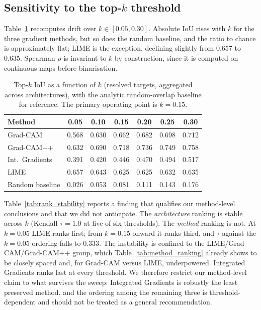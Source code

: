 \documentclass[fleqn,10pt]{wlscirep}
\begin{document}
\subsection*{Sensitivity to the top-$k$ threshold}

Table~\ref{tab:k_sweep} recomputes drift over $k \in [0.05, 0.30]$. Absolute IoU rises with $k$ for the three gradient methods, but so does the random baseline, and the ratio to chance is approximately flat; LIME is the exception, declining slightly from $0.657$ to $0.635$. Spearman $\rho$ is invariant to $k$ by construction, since it is computed on continuous maps before binarisation.

\begin{table}[!ht]
\centering
\caption{Top-$k$ IoU as a function of $k$ (resolved targets, aggregated across architectures), with the analytic random-overlap baseline for reference. The primary operating point is $k = 0.15$.}
\label{tab:k_sweep}
\begin{tabular}{lcccccc}
\toprule
\textbf{Method} & 0.05 & 0.10 & 0.15 & 0.20 & 0.25 & 0.30 \\
\midrule
Grad-CAM & 0.568 & 0.630 & 0.662 & 0.682 & 0.698 & 0.712 \\
Grad-CAM++ & 0.632 & 0.690 & 0.718 & 0.736 & 0.749 & 0.758 \\
Int.\ Gradients & 0.391 & 0.420 & 0.446 & 0.470 & 0.494 & 0.517 \\
LIME & 0.657 & 0.643 & 0.625 & 0.625 & 0.632 & 0.635 \\
\midrule
Random baseline & 0.026 & 0.053 & 0.081 & 0.111 & 0.143 & 0.176 \\
\bottomrule
\end{tabular}
\end{table}

Table~\ref{tab:rank_stability} reports a finding that qualifies our method-level conclusions and that we did not anticipate. The \emph{architecture} ranking is stable across $k$ (Kendall $\tau = 1.0$ at five of six thresholds). The \emph{method} ranking is not. At $k = 0.05$ LIME ranks first; from $k = 0.15$ onward it ranks third, and $\tau$ against the $k = 0.05$ ordering falls to $0.333$. The instability is confined to the LIME/Grad-CAM/Grad-CAM++ group, which Table~\ref{tab:method_ranking} already shows to be closely spaced and, for Grad-CAM versus LIME, underpowered. Integrated Gradients ranks last at every threshold. We therefore restrict our method-level claim to what survives the sweep: Integrated Gradients is robustly the least preserved method, and the ordering among the remaining three is threshold-dependent and should not be treated as a general recommendation.
\end{document}
